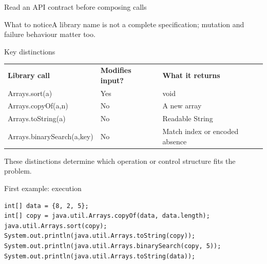 \documentclass[10pt,aspectratio=169]{beamer}
\begin{document}
\begin{frame}[fragile,t]{Read an API contract before composing calls}
\begin{center}\end{center}
\begin{block}{What to notice}A library name is not a complete specification; mutation and failure behaviour matter too.\end{block}
\end{frame}
\begin{frame}[fragile,t]{Key distinctions}
\small\renewcommand{\arraystretch}{1.5}
\begin{tabularx}{\textwidth}{>{\raggedright\arraybackslash}X>{\raggedright\arraybackslash}X>{\raggedright\arraybackslash}X}
\rowcolor{navy}
\color{white}\bfseries Library call & \color{white}\bfseries Modifies input? & \color{white}\bfseries What it returns\\
Arrays.sort(a) & Yes & void\\
Arrays.copyOf(a,n) & No & A new array\\
Arrays.toString(a) & No & Readable String\\
Arrays.binarySearch(a,key) & No & Match index or encoded absence\\
\end{tabularx}
\vspace{3mm}\footnotesize These distinctions determine which operation or control structure fits the problem.
\end{frame}

\begin{frame}[fragile,t]{First example: execution}
\begin{lstlisting}
int[] data = {8, 2, 5};
int[] copy = java.util.Arrays.copyOf(data, data.length);
java.util.Arrays.sort(copy);
System.out.println(java.util.Arrays.toString(copy));
System.out.println(java.util.Arrays.binarySearch(copy, 5));
System.out.println(java.util.Arrays.toString(data));
\end{lstlisting}
\end{frame}
\end{document}
